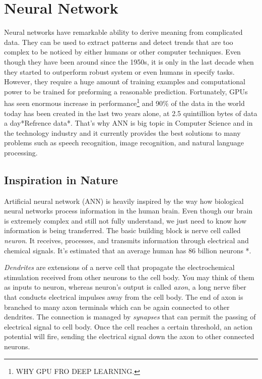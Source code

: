 \chapter{Neural Network}


Neural networks have remarkable ability to derive meaning from complicated data. They can be used to extract patterns and detect trends that are too complex to be noticed by either humans or other computer techniques.
Even though they have been around since the 1950s, it is only in the last decade when they started to outperform robust system or even humans in specify tasks.
However, they require a huge amount of training examples and computational power to be trained for preforming a reasonable prediction.
Fortunately, GPUs has seen enormous increase in performance\footnote{\label{note1}WHY GPU FRO DEEP LEARNING.} and
90\% of the data in the world today has been created in the last two years alone, at 2.5 quintillion bytes of data a day*Refrence data*.
That's why ANN is big topic in Computer Science and in the technology industry and it currently provides the best solutions to many problems such as speech recognition, image recognition, and natural language processing.

\section{Inspiration in Nature}

Artificial neural network (ANN) is heavily inspired by the way how biological neural networks process information in the human brain.
Even though our brain is extremely complex and still not fully understand, we just need to know how information is being transferred.
The basic building block is nerve cell called \textit{neuron}. It receives, processes, and transmits information through electrical and chemical signals.
It's estimated that an average human has 86 billion neurons *.


\textit{Dendrites} are extensions of a nerve cell that propagate the electrochemical stimulation received from other neurons to the cell body.
You may think of them as inputs to neuron, whereas neuron's output is called \textit{axon}, a long nerve fiber that conducts electrical impulses away from the cell body.
The end of axon is branched to many axon terminals which can be again connected to other dendrites.
The connection is managed by \textit{synapses} that can permit the passing of electrical signal to cell body.
Once the cell reaches a certain threshold, an action potential will fire, sending the electrical signal down the axon to other connected neurons.

